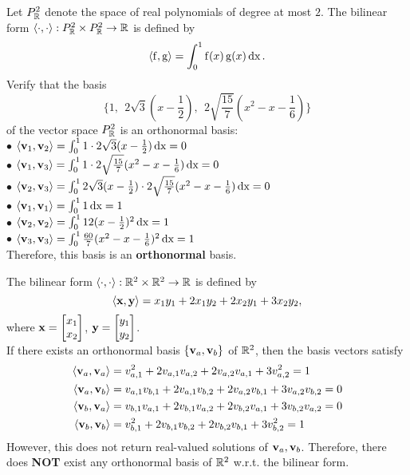 \begin{example}
Let $P^2_{\mathbb{R}}$ denote the space of real polynomials of degree at most $2$. 
The bilinear form $\langle \cdot, \cdot \rangle: P^2_{\mathbb{R}} \times P^2_{\mathbb{R}} \to \mathbb{R}$ is defined by
%
$$\langle \operatorname{f}, \operatorname{g} \rangle = \int_{0}^1 \operatorname{f}(x) \operatorname{g}(x) \operatorname{d\textnormal{x}}.$$
%
Verify that the basis 
%
$$\{1, ~\ 2\sqrt{3}(x-\frac12), ~\ 2\sqrt{\frac{15}{7}}(x^2-x-\frac16) \}$$
%
of the vector space $P^2_{\mathbb{R}}$ is an orthonormal basis:\\
%
$\bullet$ $\langle \mathbf{v}_1, \mathbf{v}_2 \rangle = \int_{0}^1 1 \cdot 2\sqrt{3}(x-\frac12) \operatorname{d\textnormal{x}} = 0$\\
$\bullet$ $\langle \mathbf{v}_1, \mathbf{v}_3 \rangle = \int_{0}^1 1 \cdot 2\sqrt{\frac{15}{7}} (x^2-x-\frac16) \operatorname{d\textnormal{x}} = 0$\\
$\bullet$ $\langle \mathbf{v}_2, \mathbf{v}_3 \rangle = \int_{0}^1 2\sqrt{3}(x-\frac12) \cdot 2\sqrt{\frac{15}{7}}(x^2-x-\frac16) \operatorname{d\textnormal{x}} = 0$\\
$\bullet$ $\langle \mathbf{v}_1, \mathbf{v}_1 \rangle = \int_{0}^1 1 \operatorname{d\textnormal{x}} = 1$\\
$\bullet$ $\langle \mathbf{v}_2, \mathbf{v}_2 \rangle = \int_{0}^1 12(x-\frac12)^2 \operatorname{d\textnormal{x}} = 1$\\
$\bullet$ $\langle \mathbf{v}_3, \mathbf{v}_3 \rangle = \int_{0}^1 
\frac{60}{7}(x^2-x-\frac16)^2 \operatorname{d\textnormal{x}} = 1$\\

\noindent Therefore, this basis is an \textbf{orthonormal} basis.
%
\end{example}
%
\begin{example}
%
The bilinear form $\langle \cdot, \cdot \rangle: \mathbb{R}^2 \times \mathbb{R}^2 \to \mathbb{R}$ is defined by 
%
$$\langle \mathbf{x}, \mathbf{y} \rangle = x_1y_1 + 2x_1y_2 + 2x_2y_1 + 3x_2y_2,$$ 
%
where $\mathbf{x} =
\begin{bmatrix}
    x_1 \\
    x_2
\end{bmatrix}$, 
$\mathbf{y} = 
\begin{bmatrix}
    y_1 \\
    y_2
\end{bmatrix}
$.\\
If there exists an orthonormal basis $\{ \mathbf{v}_a, \mathbf{v}_b \}$ of $\mathbb{R}^2$, then the basis vectors satisfy
%
\begin{align*}
    \langle \mathbf{v}_a, \mathbf{v}_a \rangle &= v_{a,1}^2 + 2v_{a,1}v_{a,2} + 2v_{a,2}v_{a,1} + 3v_{a,2}^2 = 1 \\
    \langle \mathbf{v}_a, \mathbf{v}_b \rangle &= v_{a,1}v_{b,1} + 2v_{a,1}v_{b,2} + 2v_{a,2}v_{b,1} + 3v_{a,2}v_{b,2} = 0\\
    \langle \mathbf{v}_b, \mathbf{v}_a \rangle &=  v_{b,1}v_{a,1} + 2v_{b,1}v_{a,2} + 2v_{b,2}v_{a,1} + 3v_{b,2}v_{a,2} = 0\\
    \langle \mathbf{v}_b, \mathbf{v}_b \rangle &= v_{b,1}^2 + 2v_{b,1}v_{b,2} + 2v_{b,2}v_{b,1} + 3v_{b,2}^2 = 1
\end{align*}
%
However, this does not return real-valued solutions of $\mathbf{v}_a, \mathbf{v}_b$.
Therefore, there does \textbf{NOT} exist any orthonormal basis of $\mathbb{R}^2$ w.r.t. the bilinear form.
%
\end{example}
